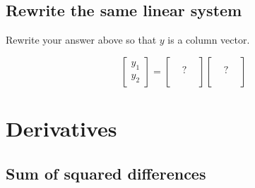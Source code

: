 \documentclass[11pt]{article}
\begin{document}
\subsection{ Rewrite the same linear system }

Rewrite your answer above so that $y$ is a column vector.

\begin{equation}
    \begin{bmatrix}
        y_1 \\  y_2 
    \end{bmatrix}
    = 
    \begin{bmatrix}
         & &  \\ 
         & ? & \\
         & &  \\ 
    \end{bmatrix}
    \begin{bmatrix}
         & &  \\ 
         & ? & \\
         & &  \\ 
    \end{bmatrix}
\end{equation}




\section{ Derivatives }

\subsection{ Sum of squared differences }
\end{document}
